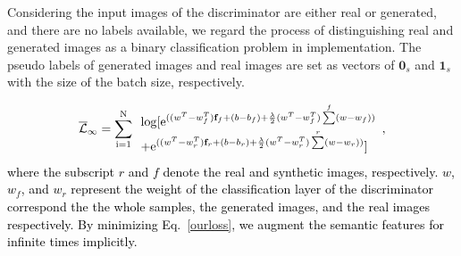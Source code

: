 \documentclass[10pt,journal,compsoc]{IEEEtran}
\newcommand{\revise}[1]{\textcolor{black}{#1}}
\begin{document}
Considering the input images of the discriminator are either real or generated, and there are no labels available, we regard the process of distinguishing real and generated images as a binary classification problem in implementation.
The pseudo labels of generated images and real images are set as vectors of $\boldsymbol{0}_s$ and $\boldsymbol{1}_s$ with the size of the batch size, respectively.

\revise{
\begin{equation}
\begin{aligned}
\label{ourloss}
{\overline {\mathcal{L}} _\infty } = \sum\limits_{{\rm{i = }}1}^{\rm{N}} \begin{array}{l}
\log [{{\rm{e}}^{((w^T - w_f^T){{\bf{f}}_f} + ({b} - {b_f}) + \frac{\lambda }{2}(w^T - w_f^T)\mathop \sum \limits^f ({w} - {w_f}))}}\\
 + {{\rm{e}}^{((w^T - w_r^T){{\bf{f}}_r} + ({b} - {b_r}) + \frac{\lambda }{2}(w^T - w_r^T)\mathop \sum \limits^r ({w} - {w_r}))}}]
\end{array} ,
\end{aligned}
\end{equation}
}
\revise{
where the subscript $r$ and $f$ denote the real and synthetic images, respectively.
$w$, $w_f$, and $w_r$ represent the weight of the classification layer of the discriminator correspond the the whole samples, the generated images, and the real images respectively.
By minimizing Eq.~\ref{ourloss}, we augment the semantic features for infinite times implicitly.
}
\end{document}
